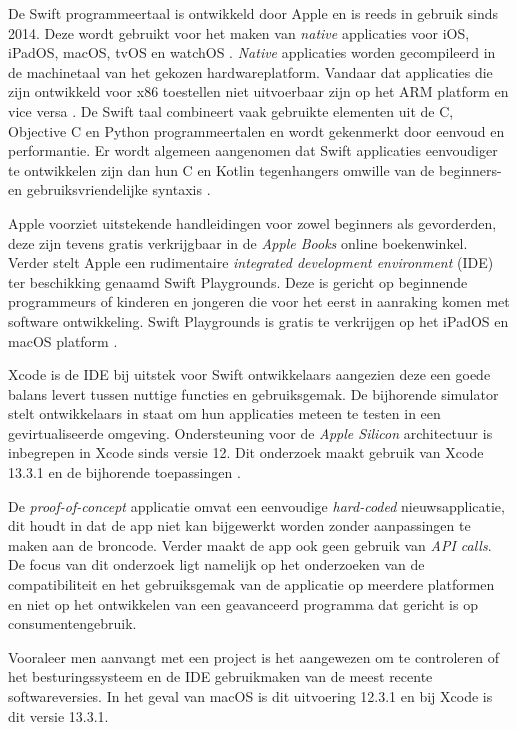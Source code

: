 De Swift programmeertaal is ontwikkeld door Apple en is reeds in gebruik sinds 2014. Deze wordt gebruikt voor het maken van \textit{native} applicaties voor iOS, iPadOS, macOS, tvOS en watchOS \autocite{AppleDeveloper2022b}. \textit{Native} applicaties worden gecompileerd in de machinetaal van het gekozen hardwareplatform. Vandaar dat applicaties die zijn ontwikkeld voor x86 toestellen niet uitvoerbaar zijn op het ARM platform en vice versa \autocite{Gillis2022}. De Swift taal combineert vaak gebruikte elementen uit de C, Objective C en Python programmeertalen en wordt gekenmerkt door eenvoud en performantie. Er wordt algemeen aangenomen dat Swift applicaties eenvoudiger te ontwikkelen zijn dan hun C en Kotlin tegenhangers omwille van de beginners- en gebruiksvriendelijke syntaxis \autocite{AppleDeveloper2022b}.

Apple voorziet uitstekende handleidingen voor zowel beginners als gevorderden, deze zijn tevens gratis verkrijgbaar in de \textit{Apple Books} online boekenwinkel. Verder stelt Apple een rudimentaire \textit{integrated development environment} (IDE) ter beschikking genaamd Swift Playgrounds. Deze is gericht op beginnende programmeurs of kinderen en jongeren die voor het eerst in aanraking komen met software ontwikkeling. Swift Playgrounds is gratis te verkrijgen op het iPadOS en macOS platform \autocite{AppleDeveloper2022b}.

Xcode is de IDE bij uitstek voor Swift ontwikkelaars aangezien deze een goede balans levert tussen nuttige functies en gebruiksgemak. De bijhorende simulator stelt ontwikkelaars in staat om hun applicaties meteen te testen in een gevirtualiseerde omgeving. Ondersteuning voor de \textit{Apple Silicon} architectuur is inbegrepen in Xcode sinds versie 12. Dit onderzoek maakt gebruik van Xcode 13.3.1 en de bijhorende toepassingen \autocite{AppleDeveloper2022a}.

De \textit{proof-of-concept} applicatie omvat een eenvoudige \textit{hard-coded} nieuwsapplicatie, dit houdt in dat de app niet kan bijgewerkt  worden zonder aanpassingen te maken aan de broncode. Verder maakt de app ook geen gebruik van \textit{API calls}. De focus van dit onderzoek ligt namelijk op het onderzoeken van de compatibiliteit en het gebruiksgemak van de applicatie op meerdere platformen en niet op het ontwikkelen van een geavanceerd programma dat gericht is op consumentengebruik.

Vooraleer men aanvangt met een project is het aangewezen om te controleren of het besturingssysteem en de IDE gebruikmaken van de meest recente softwareversies. In het geval van macOS is dit uitvoering 12.3.1 en bij Xcode is dit versie 13.3.1.

